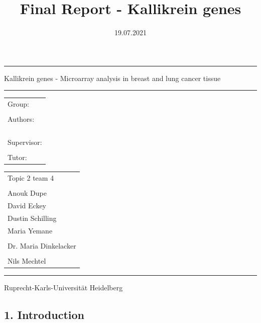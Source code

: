 \documentclass[
]{article}
\title{Final Report - Kallikrein genes}
\author{}
\date{\vspace{-2.5em}19.07.2021}
\begin{document}
\maketitle

\pagebreak
\tableofcontents
\pagebreak
{}
\usepackage{float}

\thispagestyle{empty}
\hrule
\vspace{0.3cm}
\begin{center}
\LARGE
    Kallikrein genes - Microarray analysis in breast and lung cancer tissue
    \vspace{0.5cm}
    \hrule 
    \vspace{1cm}
  \large
    \begin{tabular}[c]{l}
    Group: \\
     \\
    Authors: \\
     \\
     \\
   \\
   \\
    Supervisor:\\
     \\
    Tutor:
    \end{tabular}
    \hspace{1.5cm}
    \begin{tabular}[c]{l}
    Topic 2 team 4 \\
     \\
    Anouk Dupe \\
    David Eckey \\
    Dustin Schilling \\
    Maria Yemane \\
     \\
    Dr. Maria Dinkelacker \\
     \\
    Nils Mechtel
    \end{tabular}
    \vspace{1cm}
    \hrule
    \vspace{0.5cm}
    Ruprecht-Karls-Universität Heidelberg \vspace{0.3cm} \\
\end{center}
\vspace{2cm}

\hypertarget{introduction}{%
\subsection{1. Introduction}\label{introduction}}
\end{document}
